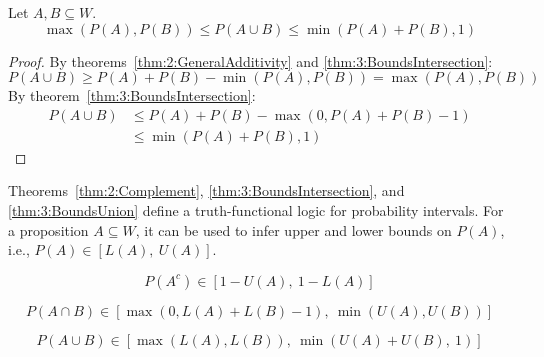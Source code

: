 \begin{thm}
  \label{thm:3:BoundsUnion}
  Let $A, B \subseteq W$.
  \begin{equation}
    \max(P(A), P(B)) \leq P(A \cup B) \leq \min(P(A) + P(B), 1)
  \end{equation}
  \begin{proof}
    By theorems~\ref{thm:2:GeneralAdditivity} and \ref{thm:3:BoundsIntersection}:
    \begin{equation}
      P(A \cup B) \geq P(A) + P(B) - \min(P(A), P(B)) = \max(P(A), P(B))
      \label{eqn:3:BoundsUnion1}
    \end{equation}
    By theorem~\ref{thm:3:BoundsIntersection}:
    \begin{align}
      P(A \cup B) & \leq P(A) + P(B) - \max(0, P(A) + P(B) - 1)          \\
                  & \leq \min(P(A) + P(B), 1) \label{eqn:3:BoundsUnion3}
    \end{align}
  \end{proof}
\end{thm}

Theorems~\ref{thm:2:Complement}, \ref{thm:3:BoundsIntersection}, and
\ref{thm:3:BoundsUnion} define a truth-functional logic for probability
intervals.
For a proposition $A \subseteq W$, it can be used to infer upper and lower
bounds on $P(A)$, i.e., $P(A) \in [L(A),\ U(A)]$.

\begin{thm}
  \begin{equation}
    P(A^c) \in [1 - U(A),\ 1 - L(A)]
  \end{equation}
\end{thm}

\begin{thm}
  \begin{equation}
    P(A \cap B) \in [\max(0, L(A) + L(B) - 1),\ \min(U(A), U(B))]
  \end{equation}
\end{thm}

\begin{thm}
  \begin{equation}
    P(A \cup B) \in [\max(L(A), L(B)),\ \min(U(A) + U(B),\ 1)]
  \end{equation}
\end{thm}

